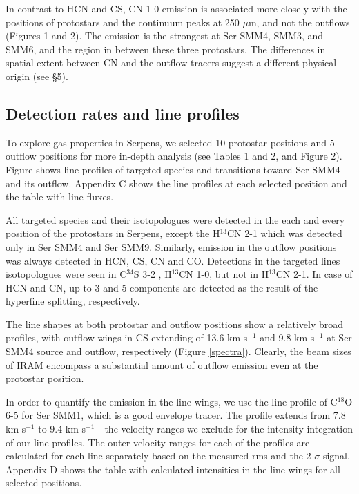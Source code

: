 \documentclass{aa}
\begin{document}
In contrast to HCN and CS, CN 1-0 emission is associated more closely with the positions of protostars
and the continuum peaks at 250 $\mu$m, and not the outflows (Figures 1 and 2). The emission is the strongest at
Ser SMM4, SMM3, and SMM6, and the region in between these three protostars. The differences in 
spatial extent between CN and the outflow tracers suggest a different physical origin (see \S 5).

\subsection{Detection rates and line profiles}
To explore gas properties in Serpens, we selected 10 protostar positions and 5 
outflow positions for more in-depth analysis (see Tables 1 and 2, and Figure 2). Figure \label{spectra} shows 
line profiles of targeted species and transitions toward Ser SMM4 and its outflow. Appendix 
C shows the line profiles at each selected position and the table with line fluxes. 

All targeted species and their isotopologues were detected in the each and every position 
of the protostars in Serpens, except the H$^{13}$CN 2-1 which was detected only in Ser SMM4 and Ser SMM9. Similarly, emission in the outflow 
positions was always detected in HCN, CS, CN and CO. Detections in the targeted lines isotopologues were seen in C$^{34}$S 3-2 , H$^{13}$CN 1-0, but not in H$^{13}$CN 2-1.
In case of HCN and CN, up to 3 and 5 components are detected as the result of the hyperfine splitting, respectively. 

The line shapes at both protostar and outflow positions show a relatively broad profiles, 
with outflow wings in CS extending of 13.6 km s$^{-1}$ and 9.8 km s$^{-1}$ at Ser SMM4 
source and outflow, respectively (Figure \ref{spectra}). Clearly, the beam sizes of 
IRAM encompass a substantial amount of outflow emission even at the protostar position. 

In order to quantify the emission in the line wings, we use the line profile of C$^{18}$O 6-5
for Ser SMM1, which is a good envelope tracer. The profile extends from 
7.8 km s$^{-1}$ to 9.4 km s$^{-1}$ - the velocity ranges we exclude for the intensity integration of our line profiles. The outer velocity ranges for each of the profiles are calculated 
for each line separately based on the measured rms and the 2 $\sigma$ signal. Appendix D 
shows the table with calculated intensities in the line wings for all selected positions.
\end{document}
